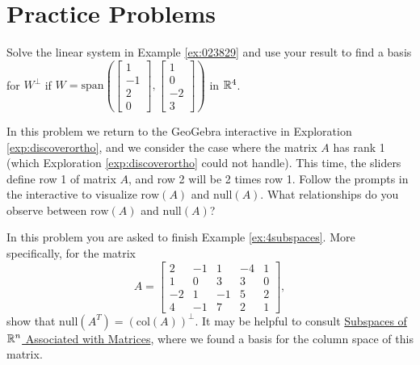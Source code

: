 \documentclass{ximera}
\begin{document}
\section*{Practice Problems}
\begin{problem}\label{prob:Uperp}
Solve the linear system in Example \ref{ex:023829} and use your result to find a basis for $W^\perp$ if $W = \mbox{span}\left(\begin{bmatrix}1\\ -1\\ 2\\ 0\end{bmatrix}, \begin{bmatrix}1\\ 0\\ -2\\ 3\end{bmatrix}\right)$ in $\mathbb{R}^4$.
\end{problem}

\begin{problem}\label{prob:brokenInteractive}
In this problem we return to the GeoGebra interactive in Exploration \ref{exp:discoverortho}, and we consider the case where the matrix $A$ has rank 1 (which Exploration \ref{exp:discoverortho} could not handle).  This time, the sliders define row 1 of matrix $A$, and row 2 will be 2 times row 1.  Follow the prompts in the interactive to visualize $\mbox{row}(A)$ and $\mbox{null}(A)$.  What relationships do you observe between $\mbox{row}(A)$ and $\mbox{null}(A)$?

    \begin{center}
\end{center}

\end{problem}

\begin{problem}\label{prob:finishex4subspaces}
In this problem you are asked to finish Example \ref{ex:4subspaces}.  More specifically, for the matrix $$A=\begin{bmatrix}2&-1&1&-4&1\\1&0&3&3&0\\-2&1&-1&5&2\\4&-1&7&2&1\end{bmatrix},$$ show that $\mbox{null}(A^T) = (\mbox{col}(A))^\perp$.  It may be helpful to consult \href{https://ximera.osu.edu/oerlinalg/LinearAlgebra/VSP-0040/main}{Subspaces of $\mathbb{R}^n$ Associated with Matrices}, where we found a basis for the column space of this matrix.
\end{problem}
\end{document}
